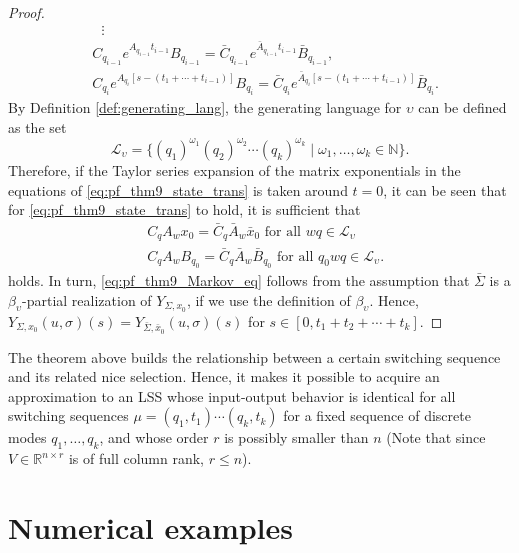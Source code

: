 \documentclass[journal]{IEEEtran}
\begin{document}
\begin{proof}
\begin{equation}
\begin{aligned}
			& \mbox{    } \vdots \\
			& C_{q_{i-1}}e^{A_{q_{i-1}}t_{i-1}}B_{q_{i-1}} = \bar{C}_{q_{i-1}}e^{\bar{A}_{q_{i-1}}t_{i-1}}\bar{B}_{q_{i-1}},  \\
			& C_{q_i}e^{A_{q_i}[s-(t_1+\cdots+t_{i-1})]}B_{q_i} = \bar{C}_{q_i}e^{\bar{A}_{q_i}[s-(t_1+\cdots+t_{i-1})]}\bar{B}_{q_i}.
		\end{aligned}
	\end{equation}
	By Definition \ref{def:generating_lang}, the generating language for $\upsilon$ can be defined as the set
	\begin{equation*}
		\mathcal{L}_{\upsilon}= \{ (q_1)^{\omega_1}(q_2)^{\omega_2}\cdots (q_k)^{\omega_k} \mid \omega_1, \dots, \omega_{k} \in \mathbb{N}\}.
	\end{equation*}
	Therefore, if the Taylor series expansion of the matrix exponentials in the equations of \eqref{eq:pf_thm9_state_trans} is taken around $t=0$, it can be seen that for
	\eqref{eq:pf_thm9_state_trans} to hold, it is sufficient that  \begin{equation} \label{eq:pf_thm9_Markov_eq}
		\begin{aligned}
			& C_qA_wx_0 = \bar{C}_q\bar{A}_w\bar{x}_0 \mbox{ for all } wq \in \mathcal{L}_{\upsilon} \\
			& C_qA_wB_{q_0} = \bar{C}_q\bar{A}_w\bar{B}_{q_0} \mbox{ for all } q_0wq \in \mathcal{L}_{\upsilon}.
		\end{aligned}
	\end{equation}
	holds. In turn, \eqref{eq:pf_thm9_Markov_eq} follows from the
	assumption that $\bar{\Sigma}$ is a $\beta_{\upsilon}$-partial
	realization of $Y_{\Sigma,x_0}$, if we use the definition of
	$\beta_{\upsilon}$.
	Hence, $Y_{\Sigma,x_0}(u,\sigma)(s)=Y_{\bar{\Sigma},\bar{x}_0}(u,\sigma)(s)$ for $s \in [0,t_1+t_2+\cdots+t_k]$.
\end{proof}


The theorem above builds the relationship between a certain switching sequence and its related nice selection. Hence, it makes it possible to acquire an approximation to an LSS whose input-output behavior is identical for all switching sequences $\mu=(q_1,t_1) \cdots (q_k,t_k)$ for a fixed sequence of discrete modes $q_1,\ldots,q_k$, and whose order $r$ is possibly smaller than $n$ (Note that since $V \in \mathbb{R}^{n \times r}$ is of full column rank, $r \leq n$).

\section{Numerical examples}
\label{sec:exam}
\end{document}
